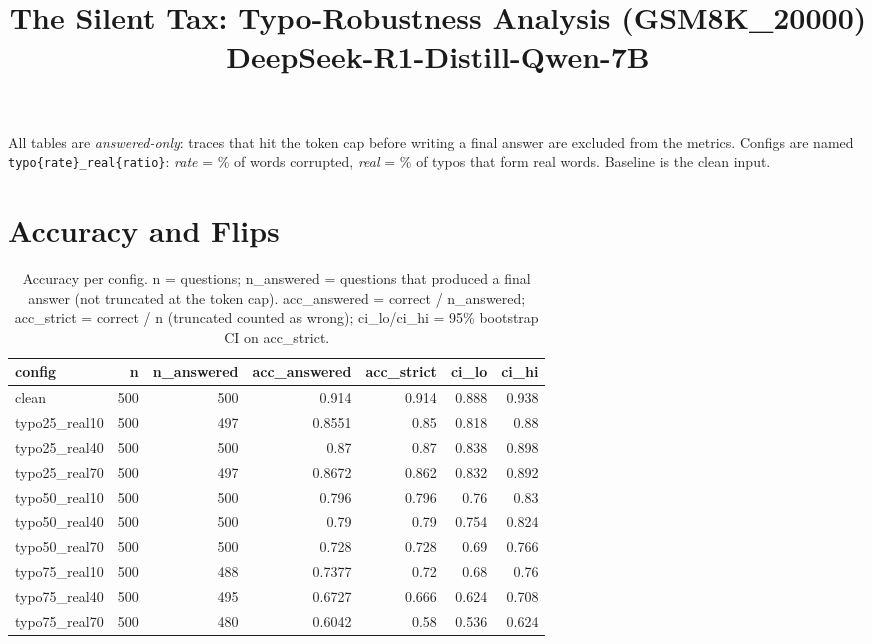 \documentclass[11pt]{article}
\title{The Silent Tax: Typo-Robustness Analysis (GSM8K\_20000)\\\large DeepSeek-R1-Distill-Qwen-7B}
\date{}
\begin{document}
\maketitle
\noindent All tables are \emph{answered-only}: traces that hit the token cap before writing a final answer are excluded from the metrics. Configs are named \texttt{typo\{rate\}\_real\{ratio\}}: \emph{rate} = \% of words corrupted, \emph{real} = \% of typos that form real words. Baseline is the clean input.

\section*{Accuracy and Flips}
\begin{table}[H]
\centering
\caption{Accuracy per config. n = questions; n\_answered = questions that produced a final answer (not truncated at the token cap). acc\_answered = correct / n\_answered; acc\_strict = correct / n (truncated counted as wrong); ci\_lo/ci\_hi = 95\% bootstrap CI on acc\_strict.}
\small
\begin{adjustbox}{max width=\textwidth}
\begin{tabular}{lrrrrrr}
\toprule
\textbf{config} & \textbf{n} & \textbf{n\_answered} & \textbf{acc\_answered} & \textbf{acc\_strict} & \textbf{ci\_lo} & \textbf{ci\_hi} \\
\midrule
clean & 500 & 500 & 0.914 & 0.914 & 0.888 & 0.938 \\
typo25\_real10 & 500 & 497 & 0.8551 & 0.85 & 0.818 & 0.88 \\
typo25\_real40 & 500 & 500 & 0.87 & 0.87 & 0.838 & 0.898 \\
typo25\_real70 & 500 & 497 & 0.8672 & 0.862 & 0.832 & 0.892 \\
typo50\_real10 & 500 & 500 & 0.796 & 0.796 & 0.76 & 0.83 \\
typo50\_real40 & 500 & 500 & 0.79 & 0.79 & 0.754 & 0.824 \\
typo50\_real70 & 500 & 500 & 0.728 & 0.728 & 0.69 & 0.766 \\
typo75\_real10 & 500 & 488 & 0.7377 & 0.72 & 0.68 & 0.76 \\
typo75\_real40 & 500 & 495 & 0.6727 & 0.666 & 0.624 & 0.708 \\
typo75\_real70 & 500 & 480 & 0.6042 & 0.58 & 0.536 & 0.624 \\
\bottomrule
\end{tabular}
\end{adjustbox}
\end{table}
\end{document}
